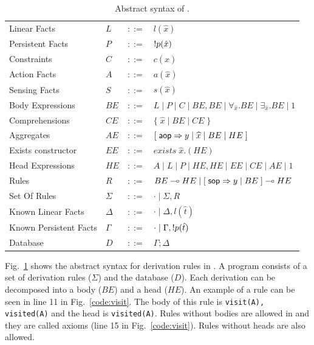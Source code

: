 \begin{table}[ht]
   \centering
\begin{tabular}{ l l c l }
  Linear Facts & $L$ & $::=$ & $l(\hat{x})$\\
  Persistent Facts & $P$ & $::=$ & ${!} p(\hat{x})$\\
  Constraints & $C$ & $::=$ & $c(\hat{x})$ \\
  Action Facts & $A$ & $::=$ & $a(\hat{x})$\\
  Sensing Facts & $S$ & $::=$ & $s(\hat{x})$\\
  Body Expressions & $BE$ & $::=$ & $L \; | \; P \; | \; C \; | \; BE, BE \; | \; \forall_{\widehat{x}}. BE \; | \; \exists_{\widehat{x}}. BE \; | \; 1$\\
  Comprehensions & $CE$ & $::=$ & $\{ \; \widehat{x} \; | \; BE \; | \; CE \; \}$ \\
  Aggregates & $AE$ & $::=$ & $[\;\mathsf{aop} \Rightarrow y \; | \; \widehat{x} \; | \; BE \; | \; HE \;]$ \\
  Exists constructor & $EE$ & $::=$ & $exists \; \widehat{x}. (HE)$ \\
  Head Expressions & $HE$ & $::=$ & $A \; | \; L \; | \; P \; | \; HE, HE \; | \; EE \; | \; CE \; | \; AE \; | \; 1$\\
  Rules & $R$ & $::=$ & $BE \multimap HE \; | \; [\; \mathsf{sop} \Rightarrow y \; | \; BE \;] \multimap HE$ \\
  Set Of Rules & $\Sigma$ & $::=$ & $\cdot \; | \; \Sigma, R$\\
  Known Linear Facts & $\Delta$ & $::=$ & $\cdot \; | \; \Delta, l(\hat{t})$ \\
  Known Persistent Facts & $\Gamma$ & $::=$ & $\cdot \; | \; \Gamma, {!} p(\hat{t})$ \\
  Database & $D$ & $::=$ & $\Gamma; \Delta$ \\
\end{tabular}
\caption{Abstract syntax of \lang.}\label{tbl:ast}
\end{table}

\renewcommand{\arraystretch}{1.0}

Fig.~\ref{tbl:ast} shows the abstract syntax for derivation rules in \lang.
A \lang program consists of a set of derivation rules ($\Sigma$) and the database ($D$).
Each derivation can be decomposed into a body ($BE$) and a head ($HE$). An example of
a rule can be seen in line 11 in Fig.~\ref{code:visit}.
The body of this rule is \texttt{visit(A), visited(A)} and the head is \texttt{visited(A)}.
Rules without bodies are allowed in \lang and they are called axioms (line 15 in Fig.~\ref{code:visit}). Rules without heads are also allowed.

